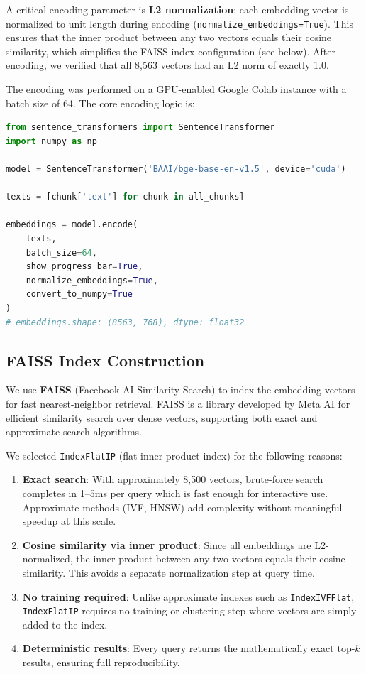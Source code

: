 \documentclass[12pt, letterpaper]{article}
\begin{document}
A critical encoding parameter is \textbf{L2 normalization}: each embedding vector is
normalized to unit length during encoding (\texttt{normalize\_embeddings=True}). This
ensures that the inner product between any two vectors equals their cosine similarity,
which simplifies the FAISS index configuration (see below). After encoding, we verified
that all 8,563 vectors had an L2 norm of exactly 1.0.

The encoding was performed on a GPU-enabled Google Colab instance with a batch size
of 64. The core encoding logic is:

\begin{lstlisting}[language=Python, caption=Encoding all chunks into normalized dense vectors]
from sentence_transformers import SentenceTransformer
import numpy as np

model = SentenceTransformer('BAAI/bge-base-en-v1.5', device='cuda')

texts = [chunk['text'] for chunk in all_chunks]

embeddings = model.encode(
    texts,
    batch_size=64,
    show_progress_bar=True,
    normalize_embeddings=True,
    convert_to_numpy=True
)
# embeddings.shape: (8563, 768), dtype: float32
\end{lstlisting}

\subsection{FAISS Index Construction}

We use \textbf{FAISS} (Facebook AI Similarity Search) to index the embedding vectors
for fast nearest-neighbor retrieval. FAISS is a library developed by Meta AI for
efficient similarity search over dense vectors, supporting both exact and approximate
search algorithms.

We selected \texttt{IndexFlatIP} (flat inner product index) for the following reasons:

\begin{enumerate}[noitemsep, topsep=4pt]
    \item \textbf{Exact search}: With approximately 8,500 vectors, brute-force search
          completes in 1--5ms per query which is fast enough for interactive use. Approximate
          methods (IVF, HNSW) add complexity without meaningful speedup at this scale.
    \item \textbf{Cosine similarity via inner product}: Since all embeddings are
          L2-normalized, the inner product between any two vectors equals their cosine
          similarity. This avoids a separate normalization step at query time.
    \item \textbf{No training required}: Unlike approximate indexes such as
          \texttt{IndexIVFFlat}, \texttt{IndexFlatIP} requires no training or clustering
          step where vectors are simply added to the index.
    \item \textbf{Deterministic results}: Every query returns the mathematically exact
          top-$k$ results, ensuring full reproducibility.
\end{enumerate}
\end{document}
